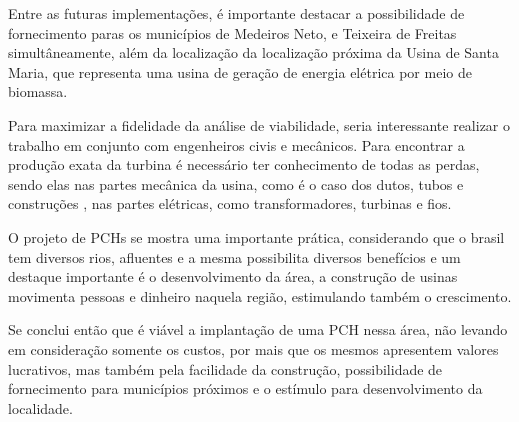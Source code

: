 Entre as futuras implementações, é importante destacar a possibilidade de fornecimento paras os municípios de Medeiros Neto, e Teixeira de Freitas simultâneamente, além da localização da localização próxima da Usina de Santa Maria, que representa uma usina de geração de energia elétrica por meio de biomassa.

Para maximizar a fidelidade da análise de viabilidade, seria interessante realizar o trabalho em conjunto com engenheiros civis e mecânicos. Para encontrar a produção exata da turbina é necessário ter conhecimento de todas as perdas, sendo elas nas partes mecânica da usina, como é o caso dos dutos, tubos e construções , nas partes elétricas, como transformadores, turbinas e fios.

O projeto de PCHs se mostra uma importante prática, considerando que o brasil tem diversos rios, afluentes e a mesma possibilita diversos benefícios e um destaque importante é o desenvolvimento da área, a construção de usinas movimenta pessoas e dinheiro naquela região, estimulando também o crescimento.

Se conclui então que é viável a implantação de uma PCH nessa área, não levando em consideração somente os custos, por mais que os mesmos apresentem valores lucrativos, mas também pela facilidade da construção, possibilidade de fornecimento para municípios próximos e o estímulo para desenvolvimento da localidade.
